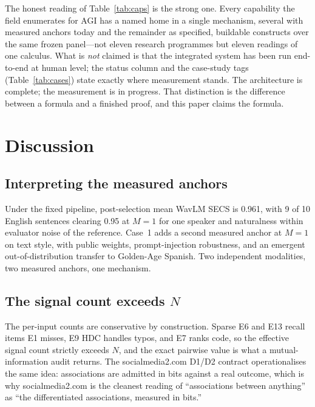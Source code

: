 \documentclass[10pt,twocolumn]{article}
\begin{document}
The honest reading of Table~\ref{tab:caps} is the strong one. Every capability the
field enumerates for AGI has a named home in a single mechanism, several with
measured anchors today and the remainder as specified, buildable constructs over
the same frozen panel---not eleven research programmes but eleven readings of one
calculus. What is \emph{not} claimed is that the integrated system has been run
end-to-end at human level; the status column and the case-study tags
(Table~\ref{tab:cases}) state exactly where measurement stands. The architecture
is complete; the measurement is in progress. That distinction is the difference
between a formula and a finished proof, and this paper claims the formula.

\section{Discussion}

\subsection{Interpreting the measured anchors}
Under the fixed pipeline, post-selection mean WavLM SECS is 0.961, with 9 of 10
English sentences clearing 0.95 at $M=1$ for one speaker and naturalness within
evaluator noise of the reference. Case~1 adds a second measured anchor at $M=1$ on
text style, with public weights, prompt-injection robustness, and an emergent
out-of-distribution transfer to Golden-Age Spanish. Two independent modalities,
two measured anchors, one mechanism.

\subsection{The signal count exceeds $N$}
The per-input counts are conservative by construction. Sparse E6 and E13 recall
items E1 misses, E9 HDC handles typos, and E7 ranks code, so the effective signal
count strictly exceeds $N$, and the exact pairwise value is what a
mutual-information audit returns. The socialmedia2.com D1/D2 contract operationalises the same
idea: associations are admitted in bits against a real outcome, which is why socialmedia2.com
is the cleanest reading of ``associations between anything'' as ``the
differentiated associations, measured in bits.''
\end{document}
